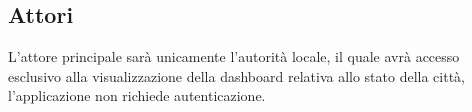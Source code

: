 \subsection{Attori}
L'attore principale sarà unicamente l'autorità locale, il quale avrà accesso esclusivo alla visualizzazione della dashboard relativa allo stato della città, l'applicazione non richiede autenticazione.